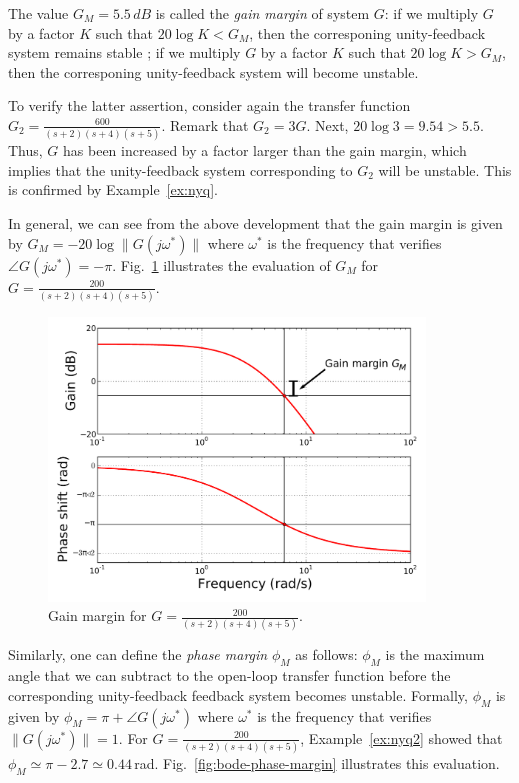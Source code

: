 \documentclass[a4paper,11pt]{report}
\theoremstyle{definition}
\begin{document}
The value $G_M=5.5\,dB$ is called the \emph{gain margin} of system
$G$: if we multiply $G$ by a factor $K$ such that $20\log K<G_M$, then
the corresponing unity-feedback system remains stable ; if we multiply
$G$ by a factor $K$ such that $20\log K>G_M$, then the corresponing
unity-feedback system will become unstable. 

To verify the latter assertion, consider again the transfer function
$G_2=\frac{600}{(s+2)(s+4)(s+5)}$. Remark that $G_2=3G$. Next, $20\log
3=9.54>5.5$. Thus, $G$ has been increased by a factor larger than the
gain margin, which implies that the unity-feedback system
corresponding to $G_2$ will be unstable. This is confirmed by
Example~\ref{ex:nyq}.

In general, we can see from the above development that the gain margin
is given by $G_M=-20\log\|G(j\omega^*)\|$ where $\omega^*$ is the
frequency that verifies $\angle
G(j\omega^*)=-\pi$. Fig.~\ref{fig:bode-gain-margin} illustrates the
evaluation of $G_M$ for $G=\frac{200}{(s+2)(s+4)(s+5)}$.
\begin{figure}[H]
  \centering
  \includegraphics[width=10cm]{fig/bode-gain-margin-mod.pdf}
  \caption{Gain margin for $G=\frac{200}{(s+2)(s+4)(s+5)}$.}
  \label{fig:bode-gain-margin}
\end{figure}

Similarly, one can define the \emph{phase margin} $\phi_M$ as follows:
$\phi_M$ is the maximum angle that we can subtract to the open-loop
transfer function before the corresponding unity-feedback feedback
system becomes unstable. Formally, $\phi_M$ is given by
$\phi_M=\pi+\angle G(j\omega^*)$ where $\omega^*$ is the frequency
that verifies $\|G(j\omega^*)\|=1$.  For
$G=\frac{200}{(s+2)(s+4)(s+5)}$, Example~\ref{ex:nyq2} showed that
$\phi_M\simeq\pi-2.7\simeq 0.44$\,rad. Fig.~\ref{fig:bode-phase-margin}
illustrates this evaluation.
\end{document}
